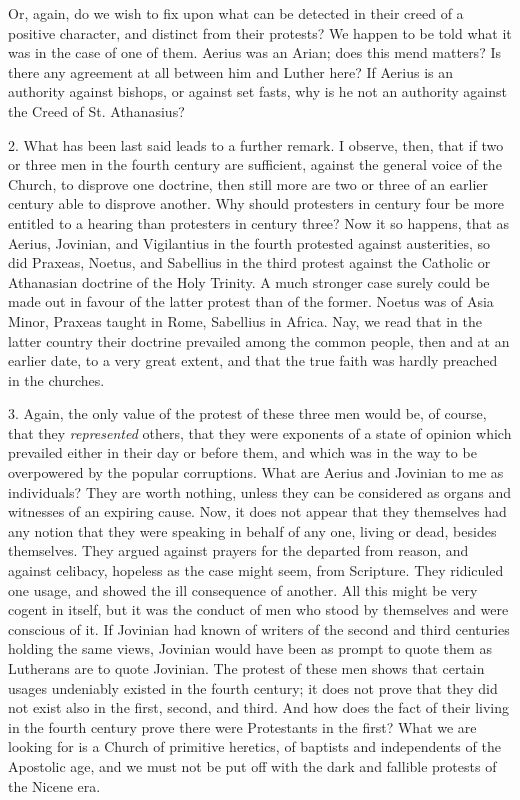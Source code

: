 Or, again, do we wish to fix upon what can be detected in their
creed of a positive character, and distinct from their protests? We
happen to be told what it was in the case of one of them. Aerius was
an Arian; does this mend matters? Is there any agreement at all
between him and Luther here? If Aerius is an authority against
bishops, or against set fasts, why is he not an authority against the
Creed of St. Athanasius?

2. What has been last said leads to a further remark. I observe,
then, that if two or three men in the fourth century are sufficient,
against the general voice of the Church, to disprove one doctrine,
then still more are two or three of an earlier century able to
disprove another. Why should protesters in century four be more
entitled to a hearing than protesters in century three? Now it so
happens, that as Aerius, Jovinian, and Vigilantius in the fourth
protested against austerities, so did Praxeas, Noetus, and Sabellius
in the third protest against the Catholic or Athanasian doctrine of
the Holy Trinity. A much stronger case surely could be made out in
favour of the latter protest than of the former. Noetus was of Asia
Minor, Praxeas taught in Rome, Sabellius in Africa. Nay, we read that
in the latter country their doctrine prevailed among the common
people, then and at an earlier date, to a very great extent, and that
the true faith was hardly preached in the churches.

3. Again, the only value of the protest of these three men would
be, of course, that they \emph{represented} others, that they were
exponents of a state of opinion which prevailed either in their
day or before them, and which was in the way to be overpowered by the
popular corruptions. What are Aerius and Jovinian to me as
individuals? They are worth nothing, unless they can be considered as
organs and witnesses of an expiring cause. Now, it does not appear
that they themselves had any notion that they were speaking in behalf
of any one, living or dead, besides themselves. They argued against
prayers for the departed from reason, and against celibacy, hopeless
as the case might seem, from Scripture. They ridiculed one usage, and
showed the ill consequence of another. All this might be very cogent
in itself, but it was the conduct of men who stood by themselves and
were conscious of it. If Jovinian had known of writers of the second
and third centuries holding the same views, Jovinian would have been
as prompt to quote them as Lutherans are to quote Jovinian. The
protest of these men shows that certain usages undeniably existed in
the fourth century; it does not prove that they did not exist also in
the first, second, and third. And how does the fact of their living in
the fourth century prove there were Protestants in the first? What we
are looking for is a Church of primitive heretics, of baptists and
independents of the Apostolic age, and we must not be put off with the
dark and fallible protests of the Nicene era.

